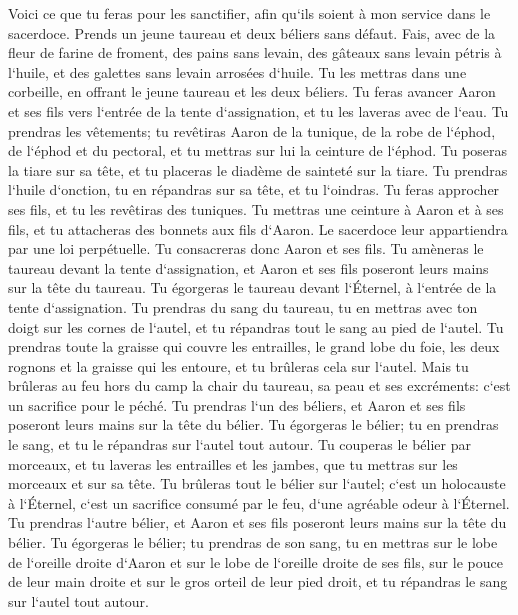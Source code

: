 \verse Voici ce que tu feras pour les sanctifier, afin qu`ils soient à mon service dans le sacerdoce. Prends un jeune taureau et deux béliers sans défaut. 
\verse Fais, avec de la fleur de farine de froment, des pains sans levain, des gâteaux sans levain pétris à l`huile, et des galettes sans levain arrosées d`huile. 
\verse Tu les mettras dans une corbeille, en offrant le jeune taureau et les deux béliers. 
\verse Tu feras avancer Aaron et ses fils vers l`entrée de la tente d`assignation, et tu les laveras avec de l`eau. 
\verse Tu prendras les vêtements; tu revêtiras Aaron de la tunique, de la robe de l`éphod, de l`éphod et du pectoral, et tu mettras sur lui la ceinture de l`éphod. 
\verse Tu poseras la tiare sur sa tête, et tu placeras le diadème de sainteté sur la tiare. 
\verse Tu prendras l`huile d`onction, tu en répandras sur sa tête, et tu l`oindras. 
\verse Tu feras approcher ses fils, et tu les revêtiras des tuniques. 
\verse Tu mettras une ceinture à Aaron et à ses fils, et tu attacheras des bonnets aux fils d`Aaron. Le sacerdoce leur appartiendra par une loi perpétuelle. Tu consacreras donc Aaron et ses fils. 
\verse Tu amèneras le taureau devant la tente d`assignation, et Aaron et ses fils poseront leurs mains sur la tête du taureau. 
\verse Tu égorgeras le taureau devant l`Éternel, à l`entrée de la tente d`assignation. 
\verse Tu prendras du sang du taureau, tu en mettras avec ton doigt sur les cornes de l`autel, et tu répandras tout le sang au pied de l`autel. 
\verse Tu prendras toute la graisse qui couvre les entrailles, le grand lobe du foie, les deux rognons et la graisse qui les entoure, et tu brûleras cela sur l`autel. 
\verse Mais tu brûleras au feu hors du camp la chair du taureau, sa peau et ses excréments: c`est un sacrifice pour le péché. 
\verse Tu prendras l`un des béliers, et Aaron et ses fils poseront leurs mains sur la tête du bélier. 
\verse Tu égorgeras le bélier; tu en prendras le sang, et tu le répandras sur l`autel tout autour. 
\verse Tu couperas le bélier par morceaux, et tu laveras les entrailles et les jambes, que tu mettras sur les morceaux et sur sa tête. 
\verse Tu brûleras tout le bélier sur l`autel; c`est un holocauste à l`Éternel, c`est un sacrifice consumé par le feu, d`une agréable odeur à l`Éternel. 
\verse Tu prendras l`autre bélier, et Aaron et ses fils poseront leurs mains sur la tête du bélier. 
\verse Tu égorgeras le bélier; tu prendras de son sang, tu en mettras sur le lobe de l`oreille droite d`Aaron et sur le lobe de l`oreille droite de ses fils, sur le pouce de leur main droite et sur le gros orteil de leur pied droit, et tu répandras le sang sur l`autel tout autour. 

